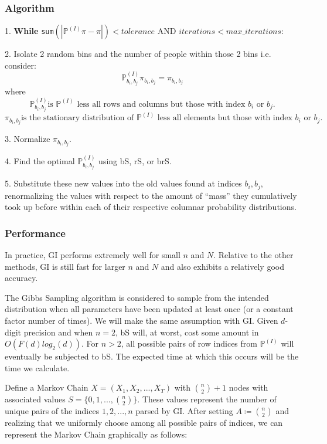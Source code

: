 \documentclass{article}
\begin{document}
\subsubsection{Algorithm}
1. \textbf{While} \texttt{sum}$(|\mathbb{P}^{(I)}\pi - \pi|) <  tolerance$ AND $iterations < max\_iterations$:

2. \hspace{1cm} Isolate 2 random bins and the number of people within those 2 bins i.e. consider:
    \[
    \mathbb{P}^{(I)}_{b_i,b_j}\pi_{b_i,b_j} = \pi_{b_i,b_j}
    \]
   \hspace{2cm} where
    \[
    \mathbb{P}^{(I)}_{b_i,b_j} \text{is $\mathbb{P}^{(I)}$ less all rows and columns but those with index } b_i \text{ or } b_j.
    \]\[
    \pi_{b_i,b_j} \text{is the stationary distribution of $\mathbb{P}^{(I)}$ less all elements but those with index } b_i \text{ or } b_j.
    \]

3. \hspace{1cm} Normalize $\pi_{b_i,b_j}$.

4. \hspace{1cm} Find the optimal $\mathbb{P}^{(I)}_{b_i,b_j}$ using bS, rS, or brS.

5. \hspace{1cm} Substitute these new values into the old values found at indices $b_i, b_j$, renormalizing the values with respect to the amount of ``mass'' they cumulatively took up before within each of their respective columnar probability distributions.

\subsubsection{Performance}
In practice, GI performs extremely well for small $n$ and $N$. Relative to the other methods, GI is still fast for larger $n$ and $N$ and also exhibits a relatively good accuracy.

The Gibbs Sampling algorithm is considered to sample from the intended distribution when all parameters have been updated at least once (or a constant factor number of times). We will make the same assumption with GI. Given $d$-digit precision and when $n=2$, bS will, at worst, cost some amount in $O(F(d)log_2(d))$. For $n>2$, all possible pairs of row indices from $\mathbb{P}^{(I)}$ will eventually be subjected to bS. The expected time at which this occurs will be the time we calculate.

Define a Markov Chain $X=(X_1,X_2,...,X_T)$ with ${n \choose 2}+1$ nodes with associated values $S = \{0,1,...,{n \choose 2}\}$. These values represent the number of unique pairs of the indices $1,2,...,n$ parsed by GI. After setting $A \coloneqq {n \choose 2}$ and realizing that we uniformly choose among all possible pairs of indices, we can represent the Markov Chain graphically as follows:
\end{document}
